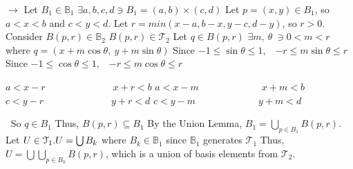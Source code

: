 \documentclass[12pt]{article}
\begin{document}
	\newline
	\(\rightarrow\) Let \(B_1 \in \mathbb{B}_1\)
	\newline
	\(\exists a,b,c,d \ni B_1 = (a,b) \times (c,d)\)
	\newline
	Let \(p = (x,y) \in B_1\), so \(a<x<b\) and \(c<y<d\).
	\newline
	Let \(r=min(x-a,b-x,y-c,d-y)\), so \(r > 0\).
	\newline \newline
	Consider \(B(p,r) \in \mathbb{B}_2\)
	\newline
	\(B(p,r)\in \mathcal{T}_2\)
	\newline
	Let \(q \in B(p,r)\) \newline
	\(\exists m,\ \theta\  \ni 0< m <r\) where \(q=(x+m\cos \theta,\  y+m\sin \theta)\)
	\newline
	Since \(-1 \leq \sin\theta \leq 1\),\ \ \(-r \leq m \sin\theta \leq r\)
	\newline
	Since \(-1 \leq \cos\theta \leq 1\),\ \ \(-r \leq m \cos\theta \leq r\)
	\newline
	\begin{adjustwidth}{2cm}{0cm}
		\begin{flushleft}
			\(a < x-r\)\ \ \ \ \ \ \ \ \ \ \ \ \ \ \(x+r<b\) \newline
			\(a<x-m\)\ \ \ \ \ \ \ \ \ \ \ \ \ \(x+m<b\) \newline
			\ \ \ \ \ \  \newline
			\newline
			\(c < y-r\)\ \ \ \ \ \ \ \ \ \ \ \ \ \ \(y+r<d\) \newline
			\(c<y-m\)\ \ \ \ \ \ \ \ \ \ \ \ \ \(y+m<d\) \newline
			\ \ \ \ \ \ 
	\end{flushleft}
	\end{adjustwidth}
	\(\ \)
	\newline
	So \(q \in B_1\) \newline
	Thus, \(B(p,r) \subseteq B_1\) \newline
	By the Union Lemma, \(B_1 = \bigcup_{p \in B_1}B(p,r)\). \newline \newline
	Let \(U \in \mathcal{T}_1.
	\newline
	U = \bigcup B_k\) where \(B_k\in
	\mathbb{B}_1\) since \(\mathbb{B}_1\) generates \(\mathcal{T}_1\)
	\newline
	Thus, \(U = \bigcup\bigcup_{p \in B_k}B(p,r)\), which is a union of basis elements from \(\mathcal{T}_2\). \newline
\end{document}
